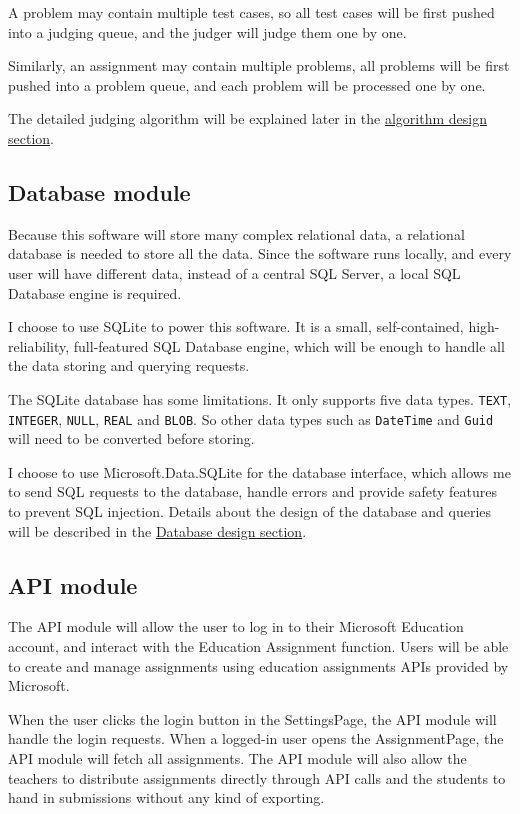 \documentclass[a4paper]{report}
\begin{document}
A problem may contain multiple test cases, so all test cases will be first pushed into a judging queue, and the judger will judge them one by one.

Similarly, an assignment may contain multiple problems, all problems will be first pushed into a problem queue, and each problem will be processed one by one.

The detailed judging algorithm will be explained later in the 
\hyperref[sec:algorithm design]{algorithm design section}.

\subsection{Database module}

Because this software will store many complex relational data, a relational database is needed to store all the data. Since the software runs locally, and every user will have different data, instead of a central SQL Server, a local SQL Database engine is required.

I choose to use SQLite to power this software. It is a small, self-contained, high-reliability, full-featured SQL Database engine, which will be enough to handle all the data storing and querying requests.

The SQLite database has some limitations. It only supports five data types. \texttt{TEXT}, \texttt{INTEGER}, \texttt{NULL}, \texttt{REAL} and \texttt{BLOB}. So other data types such as \texttt{DateTime} and \texttt{Guid} will need to be converted before storing.

I choose to use Microsoft.Data.SQLite for the database interface, which allows me to send SQL requests to the database, handle errors and provide safety features to prevent SQL injection. Details about the design of the database and queries will be described in the \hyperref[subsec:database design]{Database design section}.

\subsection{API module}

The API module will allow the user to log in to their Microsoft Education account, and interact with the Education Assignment function. Users will be able to create and manage assignments using education assignments APIs provided by Microsoft.

When the user clicks the login button in the SettingsPage, the API module will handle the login requests. When a logged-in user opens the AssignmentPage, the API module will fetch all assignments. The API module will also allow the teachers to distribute assignments directly through API calls and the students to hand in submissions without any kind of exporting.
\end{document}
